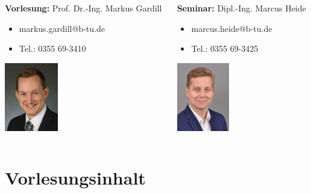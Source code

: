 \begin{frame}
    \begin{columns}[onlytextwidth]
        \begin{column}{0.5\textwidth}
            \textbf{Vorlesung:} Prof. Dr.-Ing. Markus Gardill
            \begin{itemize}
                \item markus.gardill@b-tu.de
                \item Tel.: 0355 69-3410
            \end{itemize}
            \begin{center}
                \includegraphics[height=3cm]{fig/photo_gardill}
            \end{center}
        \end{column}
        \begin{column}{0.5\textwidth}
            \textbf{Seminar:} Dipl.-Ing. Marcus Heide
            \begin{itemize}
                \item marcus.heide@b-tu.de
                \item Tel.: 0355 69-3425
            \end{itemize}
            \begin{center}
                \includegraphics[height=3cm]{fig/photo_heide}
            \end{center}
        \end{column}
    \end{columns}

\end{frame}

\section{Vorlesungsinhalt}

